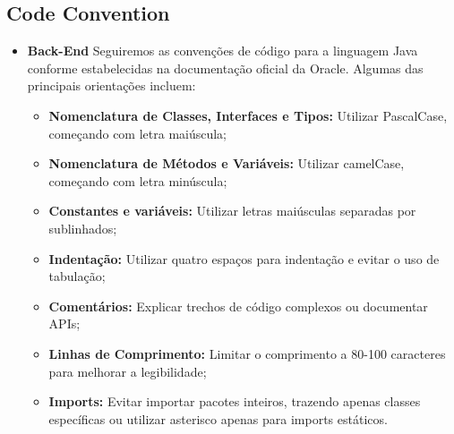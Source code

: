 \subsection{Code Convention}
\begin{itemize}
    \item \textbf{Back-End}
     Seguiremos as convenções de código  para a linguagem Java conforme estabelecidas na documentação oficial da Oracle. Algumas das principais orientações incluem:
     \begin{itemize}
        \item \textbf{Nomenclatura de Classes, Interfaces e Tipos:}
        Utilizar PascalCase, começando com letra maiúscula;
        \item \textbf{Nomenclatura de Métodos e Variáveis:}
        Utilizar camelCase, começando com letra minúscula;
        \item \textbf{Constantes e variáveis:}
        Utilizar letras maiúsculas separadas por sublinhados;
        \item \textbf{Indentação:}
        Utilizar quatro espaços para indentação e evitar o uso de tabulação;
        \item \textbf{Comentários:}
        Explicar trechos de código complexos ou documentar APIs;
        \item \textbf{Linhas de Comprimento:}
         Limitar o comprimento a 80-100 caracteres para melhorar a legibilidade;
        \item \textbf{Imports:}
        Evitar importar pacotes inteiros, trazendo apenas classes específicas ou utilizar asterisco apenas para imports estáticos.
     \end{itemize}
\end{itemize}
